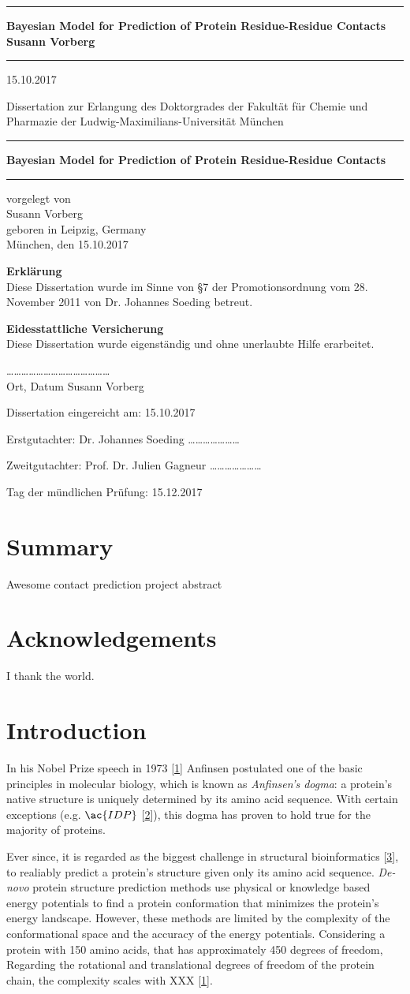 \documentclass[12pt,a4paper,twoside]{book}
\newcommand{\LMUCover}[3]{
    \thispagestyle{empty}
    {\parindent0cm \rule{\linewidth}{.7ex}}
    
    \begin{flushright}
      \vspace*{\stretch{1}}
      \sffamily\bfseries\Huge
      #1\\
      \vspace*{\stretch{1}}
      \sffamily\bfseries\large
      #2
      \vspace*{\stretch{1}}
    \end{flushright}
  
    \rule{\linewidth}{.7ex}
    \vspace*{\stretch{5}}
    \vspace*{\stretch{1}}
    
    \begin{center}\sffamily\LARGE{#3}\end{center}
}
\newcommand{\LMUTitlePage}[4]{
    \thispagestyle{empty}
    \vspace*{\stretch{1}}
    
    \begin{center}
      \Large Dissertation zur Erlangung des Doktorgrades der Fakultät für Chemie und Pharmazie der Ludwig-Maximilians-Universität München
    \end{center}
    
    \vspace*{\stretch{1}}
    {\parindent0cm \rule{\linewidth}{.7ex}}
    
    \begin{flushright}
      \vspace*{\stretch{1}}
      \sffamily\bfseries\Huge
      #1\\
      \vspace*{\stretch{1}}
    \end{flushright}
  
    \rule{\linewidth}{.7ex}

    \vspace*{\stretch{3}}
    \begin{center}
      \Large vorgelegt von\\
      \Large #2\\
      \Large geboren in #3\\
      \vspace*{\stretch{2}}
      \Large München, den #4
    \end{center}
}
\newcommand{\LMUErklaerung}[5]{
    \thispagestyle{empty}
    \begin{flushleft}
      \large \textbf{Erklärung} \\[1mm]
      \large Diese Dissertation wurde im Sinne von §7 der Promotionsordnung vom 28. November 2011 von #2 betreut.
      \bigskip
  
      \large \textbf{Eidesstattliche Versicherung}\\[1mm]
      \large Diese Dissertation wurde eigenständig und ohne unerlaubte Hilfe erarbeitet.
      \vspace{5em}
  
      \dots\dots\dots   \dots\dots\dots \hfill \dots\dots\dots\dots\dots\dots\dots\dots\\
      \large Ort, Datum \hfill #1
      \vfill
  
  
      \large Dissertation eingereicht am: \hfill #4
      \bigskip
    
      \large Erstgutachter:  #2 \hfill \dots\dots\dots\dots\dots\dots\dots
      \bigskip
    
      \large Zweitgutachter: #3 \hfill \dots\dots\dots\dots\dots\dots\dots
      \bigskip
    
      \large Tag der mündlichen Prüfung: \hfill #5
    \end{flushleft}
}
\theoremstyle{definition}
\theoremstyle{definition}
\theoremstyle{remark}
\begin{document}
\frontmatter

\LMUCover
	{Bayesian Model for Prediction of Protein Residue-Residue Contacts}
	{Susann Vorberg}
	{15.10.2017}

\newpage
\thispagestyle{empty}
\cleardoublepage

\LMUTitlePage
	{Bayesian Model for Prediction of Protein Residue-Residue Contacts}
	{Susann Vorberg}
	{Leipzig, Germany}
	{15.10.2017}

\newpage
\thispagestyle{empty}
\cleardoublepage

\LMUErklaerung
	{Susann Vorberg}
	{Dr. Johannes Soeding}
	{Prof. Dr. Julien Gagneur}
	{15.10.2017}
	{15.12.2017}

\newpage
\thispagestyle{empty}
\cleardoublepage
\frontmatter\setcounter{page}{1}

\chapter*{Summary}\label{summary}

Awesome contact prediction project abstract

\chapter*{Acknowledgements}\label{acknowledgements}

I thank the world.

\tableofcontents
{}

\mainmatter \setcounter{page}{1}

\chapter{Introduction}\label{introduction}

In his Nobel Prize speech in 1973
{[}\protect\hyperlink{ref-Anfinsen1973}{1}{]} Anfinsen postulated one of
the basic principles in molecular biology, which is known as
\emph{Anfinsen's dogma}: a protein's native structure is uniquely
determined by its amino acid sequence. With certain exceptions (e.g.
\(\ac{IDP}\) {[}\protect\hyperlink{ref-Wright1999}{2}{]}), this dogma
has proven to hold true for the majority of proteins.

Ever since, it is regarded as the biggest challenge in structural
bioinformatics {[}\protect\hyperlink{ref-Samish2015}{3}{]}, to realiably
predict a protein's structure given only its amino acid sequence.
\emph{De-novo} protein structure prediction methods use physical or
knowledge based energy potentials to find a protein conformation that
minimizes the protein's energy landscape. However, these methods are
limited by the complexity of the conformational space and the accuracy
of the energy potentials. Considering a protein with 150 amino acids,
that has approximately 450 degrees of freedom, Regarding the rotational
and translational degrees of freedom of the protein chain, the
complexity scales with XXX
{[}\protect\hyperlink{ref-Anfinsen1973}{1}{]}.
\end{document}
